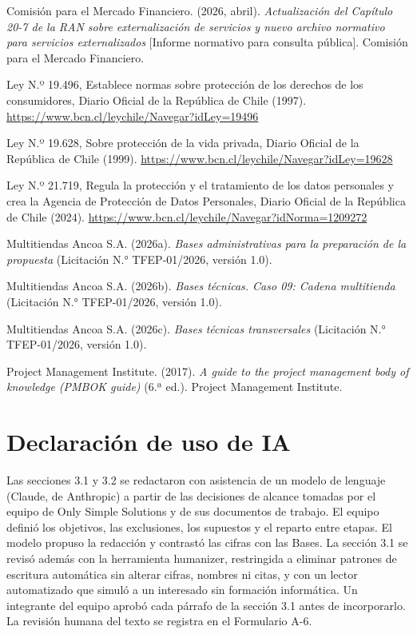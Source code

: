 \documentclass[11pt]{article}
\begin{document}
Comisión para el Mercado Financiero. (2026, abril). \textit{Actualización del Capítulo 20-7 de la RAN sobre externalización de servicios y nuevo archivo normativo para servicios externalizados} [Informe normativo para consulta pública]. Comisión para el Mercado Financiero.

Ley N.º 19.496, Establece normas sobre protección de los derechos de los consumidores, Diario Oficial de la República de Chile (1997). \url{https://www.bcn.cl/leychile/Navegar?idLey=19496}

Ley N.º 19.628, Sobre protección de la vida privada, Diario Oficial de la República de Chile (1999). \url{https://www.bcn.cl/leychile/Navegar?idLey=19628}

Ley N.º 21.719, Regula la protección y el tratamiento de los datos personales y crea la Agencia de Protección de Datos Personales, Diario Oficial de la República de Chile (2024). \url{https://www.bcn.cl/leychile/Navegar?idNorma=1209272}

Multitiendas Ancoa S.A. (2026a). \textit{Bases administrativas para la preparación de la propuesta} (Licitación N.° TFEP-01/2026, versión 1.0).

Multitiendas Ancoa S.A. (2026b). \textit{Bases técnicas. Caso 09: Cadena multitienda} (Licitación N.° TFEP-01/2026, versión 1.0).

Multitiendas Ancoa S.A. (2026c). \textit{Bases técnicas transversales} (Licitación N.° TFEP-01/2026, versión 1.0).

Project Management Institute. (2017). \textit{A guide to the project management body of knowledge (PMBOK guide)} (6.ª ed.). Project Management Institute.

\section*{Declaración de uso de IA}

Las secciones 3.1 y 3.2 se redactaron con asistencia de un modelo de lenguaje (Claude, de Anthropic) a partir de las decisiones de alcance tomadas por el equipo de Only Simple Solutions y de sus documentos de trabajo. El equipo definió los objetivos, las exclusiones, los supuestos y el reparto entre etapas. El modelo propuso la redacción y contrastó las cifras con las Bases. La sección 3.1 se revisó además con la herramienta humanizer, restringida a eliminar patrones de escritura automática sin alterar cifras, nombres ni citas, y con un lector automatizado que simuló a un interesado sin formación informática. Un integrante del equipo aprobó cada párrafo de la sección 3.1 antes de incorporarlo. La revisión humana del texto se registra en el Formulario A-6.

\ossFinalPage
\end{document}
